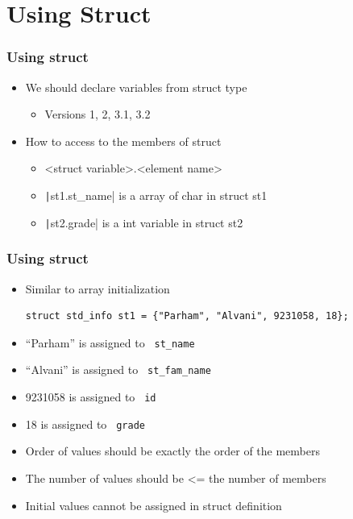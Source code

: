 \documentclass{../c-lecture}
\begin{document}
\section{Using Struct}

\begin{frame}
  \frametitle{Using struct}
  \begin{itemize}
    \item We should declare variables from struct type
    \begin{itemize}
      \item Versions 1, 2, 3.1, 3.2
    \end{itemize}
    \item How to access to the members of struct
    \begin{itemize}
      \item
        <struct variable>.<element name>
      \item
        \texttt|st1.st_name| is a array of char in struct
        st1
      \item
        \texttt|st2.grade| is a int variable in struct st2
    \end{itemize}
  \end{itemize}
\end{frame}

\begin{frame}[fragile]
  \frametitle{Using struct}
  \begin{itemize}
    \item Similar to array initialization
    \begin{verbatim}
struct std_info st1 = {"Parham", "Alvani", 9231058, 18};
    \end{verbatim}
    \item
      {\color{Orange} ``Parham''} is assigned to
      \texttt{\color{LimeGreen} st\_name}

    \item
      {\color{Orange} ``Alvani''} is assigned to
      \texttt{\color{LimeGreen} st\_fam\_name}

    \item
      {\color{Orange} 9231058} is assigned to
      \texttt{\color{LimeGreen} id}

    \item
      {\color{Orange} 18} is assigned to
      \texttt{\color{LimeGreen} grade}
  \end{itemize}

  \begin{block}{}
    \begin{itemize}
      \item Order of values should be exactly the order of the members
      \item The number of values should be <= the number of members
      \item Initial values cannot be assigned in struct definition
    \end{itemize}
  \end{block}
\end{frame}
\end{document}
